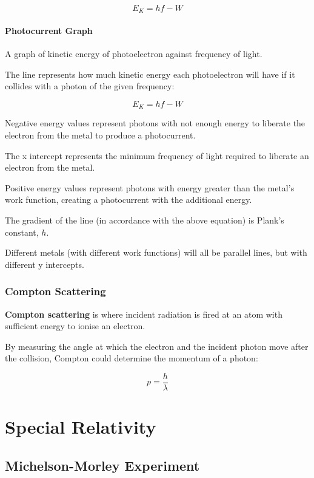 \documentclass[a4paper,11pt]{report}
\begin{document}
$$
E_K = hf - W
$$

\subsubsection{Photocurrent Graph}


A graph of kinetic energy of photoelectron against frequency of light.

The line represents how much kinetic energy each photoelectron will have if it
collides with a photon of the given frequency:

$$
E_K = hf - W
$$

Negative energy values represent photons with not enough energy to liberate the
electron from the metal to produce a photocurrent.

The x intercept represents the minimum frequency of light required to liberate
an electron from the metal.

Positive energy values represent photons with energy greater than the metal's
work function, creating a photocurrent with the additional energy.

The gradient of the line (in accordance with the above equation) is Plank's
constant, $h$.

Different metals (with different work functions) will all be parallel lines,
but with different y intercepts.

\subsection{Compton Scattering}

\textbf{Compton scattering} is where incident radiation is fired at an atom
with sufficient energy to ionise an electron.

By measuring the angle at which the electron and the incident photon move after
the collision, Compton could determine the momentum of a photon:

$$
p = \frac{h}{\lambda}
$$




\chapter{Special Relativity}

\section{Michelson-Morley Experiment}
\end{document}
